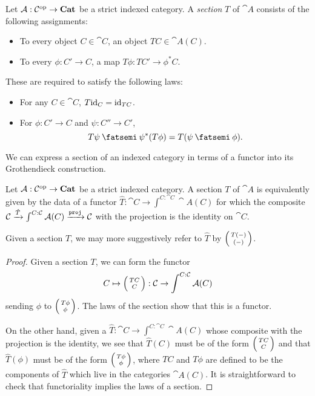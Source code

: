 \documentclass[DynamicalBook]{subfiles}
\begin{document}
\begin{definition}
  Let $\mathcal{A} : \mathcal{C}^{\textnormal{op}} \to \textbf{Cat}$ be a strict indexed category. A
  \emph{section} $T$ of $\cat{A}$ consists of the following assignments:
  \begin{itemize}
    \item To every object $C \in \cat{C}$, an object $TC \in \cat{A}(C)$.
    \item To every $\phi : C' \to C$, a map $T\phi : TC' \to \phi^{\ast}C$.
  \end{itemize}
  These are required to satisfy the following laws:
  \begin{itemize}
    \item For any $C \in \cat{C}$, $T\mathrm{id}_C = \mathrm{id}_{TC}$.
    \item For $\phi : C' \to C$ and $\psi : C'' \to C'$,
      $$T\psi \then \psi^{\ast}(T\phi) = T(\psi \then \phi).$$
  \end{itemize}
\end{definition}

We can express a section of an indexed category in terms of a functor into its
Grothendieck construction.
\begin{proposition}\label{prop.section_indexed_category}
  Let $\mathcal{A} : \mathcal{C}^{\textnormal{op}} \to \textbf{Cat}$ be a strict indexed category. A section $T$
  of $\cat{A}$ is equivalently given by the data of a functor $\hat{T} : \cat{C}
  \to \int^{C : \cat{C}} \cat{A}(C)$ for which the composite $\mathcal{C} \xrightarrow{\hat{T}}
  \int^{C : \mathcal{C}}\mathcal{A}(C) \xrightarrow{\mathtt{proj}} \mathcal{C}$ with the projection
  is the identity on $\cat{C}$.

  Given a section $T$, we may more suggestively refer to $\hat{T}$ by $\lens{T(-)}{(-)}$.
\end{proposition}
\begin{proof}
  Given a section $T$, we can form the functor
  $$C \mapsto \lens{TC}{C} : \cat{C} \to \int^{C : \cat{C}}\cat{A}(C)$$
sending $\phi$ to $\lens{T\phi}{\phi}$. The laws of the section show that this
is a functor. 

On the other hand, given a $\hat{T} : \cat{C} \to \int^{C : \cat{C}}\cat{A}(C)$
whose composite with the projection is the identity, we see that $\hat{T}(C)$
must be of the form $\lens{TC}{C}$ and that $\hat{T}(\phi)$ must be of the form
$\lens{T\phi}{\phi}$, where $TC$ and $T\phi$ are defined to be the components of
$\hat{T}$ which live in the categories $\cat{A}(C)$. It is straightforward to
check that functoriality implies the laws of a section.
\end{proof}
\end{document}
